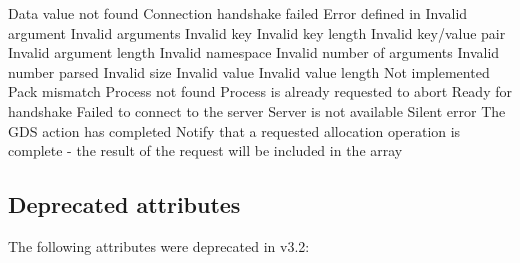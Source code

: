 \begin{constantdesc}
%
Data value not found
%
Connection handshake failed
%
Error defined in 
%
Invalid argument
%
Invalid arguments
%
Invalid key
%
Invalid key length
%
Invalid key/value pair
%
Invalid argument length
%
Invalid namespace
%
Invalid number of arguments
%
Invalid number parsed
%
Invalid size
%
Invalid value
%
Invalid value length
%
Not implemented
%
Pack mismatch
%
Process not found
%
Process is already requested to abort
%
Ready for handshake
%
Failed to connect to the server
%
Server is not available
%
Silent error
%
The \ac{GDS} action has completed
%
Notify that a requested allocation operation is complete - the result of
the request will be included in the  array
%
\end{constantdesc}


\subsection{Deprecated attributes}

The following attributes were deprecated in v3.2:

